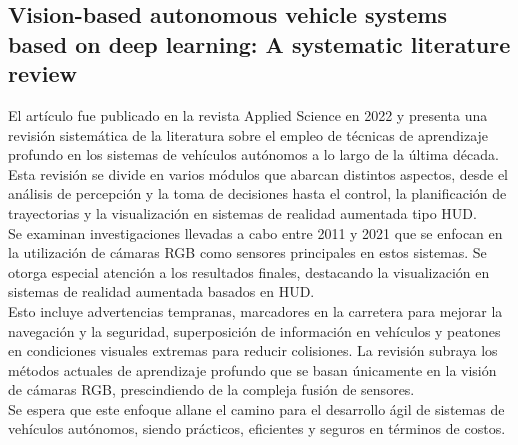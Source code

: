 \subsection{
    \textbf{Vision-based autonomous vehicle systems based on deep learning: A systematic literature review}
    ~\cite{pavel2022vision}
}\label{subsec:vision-based-autonomous-vehicle}
El artículo fue publicado en la revista Applied Science en 2022 y presenta una revisión sistemática de la literatura sobre el empleo
de técnicas de aprendizaje profundo en los sistemas
de vehículos autónomos a lo largo de la última década.                                                                    \\Esta revisión se divide en varios módulos que abarcan distintos aspectos,
desde el análisis de percepción y la toma de decisiones hasta el control, la planificación de trayectorias
y la visualización en sistemas de realidad aumentada tipo HUD.                                                                                                                   \\
Se examinan investigaciones llevadas a cabo entre 2011 y 2021 que se enfocan en la utilización de cámaras RGB como sensores principales
en estos sistemas. Se otorga especial atención a los resultados finales, destacando la visualización en sistemas de realidad aumentada
basados en HUD.                                                                                                      \\Esto incluye advertencias tempranas, marcadores en la carretera para mejorar la navegación y la seguridad, superposición
de información en vehículos y peatones en condiciones visuales extremas para reducir colisiones.
La revisión subraya los métodos actuales de aprendizaje profundo que se basan únicamente en la visión de cámaras RGB, prescindiendo de la
compleja fusión de sensores.                                                                     \\Se espera que este enfoque allane el camino para el desarrollo ágil de sistemas de vehículos autónomos,
siendo prácticos, eficientes y seguros en términos de costos.                                                               \\
